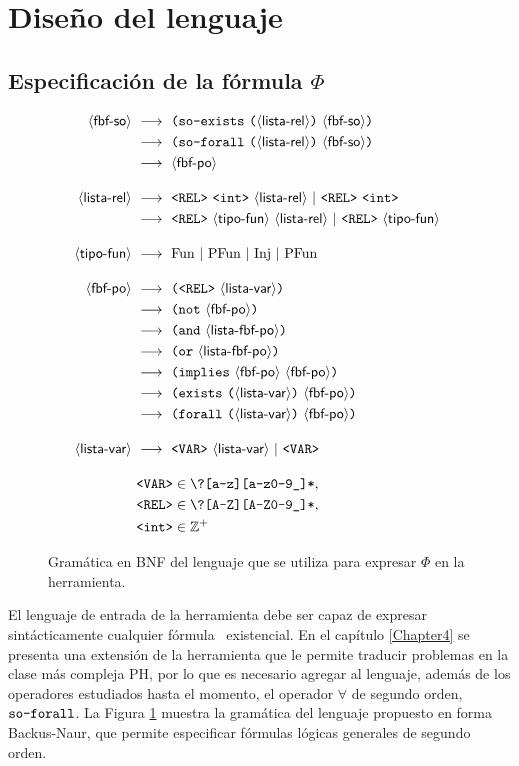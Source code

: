 \section{Diseño del lenguaje}

\subsection{Especificación de la fórmula $\Phi$}
\begin{figure}[h]
\begin{alignat*}{1}
\sofbf\   & \deriv\ \lpar \SOExists\ \lpar \listrel \rpar\ \sofbf \rpar \\
          & \deriv\ \lpar \SOForall\ \lpar \listrel \rpar\ \sofbf \rpar \\
          & \deriv\ \pofbf \\[1em]
\listrel\ & \deriv\ \rel\ \integer\ \listrel\ |\ \rel\ \integer \\
          & \deriv\ \rel\ \tipof\ \listrel\ |\ \rel\ \tipof\ \\[1em]
\tipof\   & \deriv\ \Fun\ |\ \PFun\ |\ \Inj\ |\ \PInj\ \\[1em]
\pofbf\   & \deriv\ \lpar \rel\ \listvar \rpar \\
          & \deriv\ \lpar \NOT\ \pofbf \rpar \\
          & \deriv\ \lpar \AND\ \listpofbf \rpar \\
          & \deriv\ \lpar \OR\ \listpofbf \rpar \\
          & \deriv\ \lpar \IMPLIES\ \pofbf\ \pofbf \rpar \\
          & \deriv\ \lpar \Exists\ \lpar \listvar \rpar\ \pofbf \rpar \\
          & \deriv\ \lpar \Forall\ \lpar \listvar \rpar\ \pofbf \rpar \\[1em]
\listvar\ & \deriv\ \var\ \listvar\ |\ \var \\[1em]
& \var \in \texttt{\textbackslash?[a-z][a-z0-9\_]*}, \\
& \rel \in \texttt{\textbackslash?[A-Z][A-Z0-9\_]*}, \\
& \integer \in \mathbb{Z}^+ \\
\end{alignat*}
\caption[Gramática en BNF del lenguaje lógico]{Gramática en BNF del lenguaje que se utiliza para expresar $\Phi$ en la herramienta.}
\label{gram}
\end{figure}
El lenguaje de entrada de la herramienta debe ser capaz de expresar
sintácticamente cualquier fórmula \LSO\ existencial. En el capítulo
\ref{Chapter4} se presenta una extensión de la herramienta que le permite
traducir problemas en la clase más compleja PH, por lo que es necesario
agregar al lenguaje, además de los operadores estudiados hasta el momento,
el operador $\forall$ de segundo orden, $\SOForall$.
La Figura \ref{gram} muestra la gramática del lenguaje propuesto
en forma Backus-Naur, que permite especificar fórmulas lógicas generales de
segundo orden.


